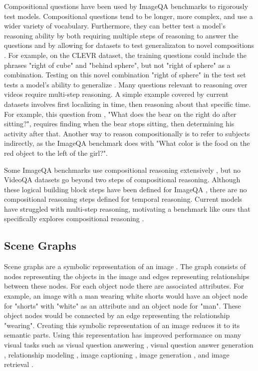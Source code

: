 \documentclass[10pt,twocolumn,letterpaper]{article}
\newcommand{\mgm}[1]{{\color{cyan}{mgm: #1}}}
\begin{document}
Compositional questions have been used by ImageQA benchmarks to rigorously test models. Compositional questions tend to be longer, more complex, and use a wider variety of vocabulary. Furthermore, they can better test a model's reasoning ability by both requiring multiple steps of reasoning to answer the questions and by allowing for datasets to test generalizaton to novel compositions \cite{johnson2017clevr, hudson2019gqa, lake2018generalization}. For example, on the CLEVR dataset, the training questions could include the phrases "right of cube" and "behind sphere", but not "right of sphere" as a combination. Testing on this novel combination "right of sphere" in the test set tests a model's ability to generalize \cite{lake2018generalization, johnson2017clevr}. Many questions relevant to reasoning over videos require multi-step reasoning. A simple example covered by current datasets involves first localizing in time, then reasoning about that specific time. For example, this question from \cite{jang2017tgif}, "What does the bear on the right do after sitting?", requires finding when the bear stops sitting, then determining his activity after that. \mgm{Is this actually 3 b/c have to look at the bear?} Another way to reason compositionally is to refer to subjects indirectly, as the ImageQA benchmark \cite{hudson2019gqa} does with "What color is the food on the red object to the left of the girl?". 

Some ImageQA benchmarks use compositional reasoning extensively \cite{johnson2017clevr, hudson2019gqa}, but no VideoQA datasets go beyond two steps of compositional reasoning. Although these logical building block steps have been defined for ImageQA \cite{cheng2015break}, there are no compositional reasoning steps defined for temporal reasoning. Current models have struggled with multi-step reasoning, motivating a benchmark like ours that specifically explores compositional reasoning \cite{fan2019heterogeneous}.


\subsection{Scene Graphs}

Scene graphs are a symbolic representation of an image \cite{krishna2017visual}. The graph consists of nodes representing the objects in the image and edges representing relationships between these nodes. For each object node there are associated attributes. For example, an image with a man wearing white shorts would have an object node for "shorts" with "white" as an attribute and an object node for "man". These object nodes would be connected by an edge representing the relationship "wearing". Creating this symbolic representation of an image reduces it to its semantic parts. Using this representation has improved performance on many visual tasks such as visual question answering \cite{johnson2017inferring}, visual question answer generation \cite{hudson2019gqa}, relationship modeling \cite{krishna2018referring}, image captioning \cite{anderson2016spice}, image generation \cite{johnson2018image, ashual2019specifying}, and image retrieval \cite{ashual2019specifying, johnson2015image}.
\end{document}
